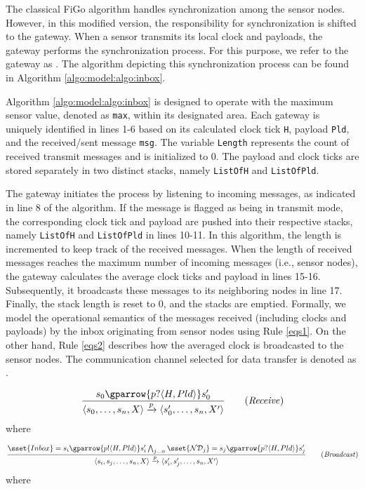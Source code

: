 The classical FiGo algorithm handles synchronization among the sensor nodes. However, in this modified version, the responsibility for synchronization is shifted to the gateway. When a sensor transmits its local clock and payloads, the gateway performs the synchronization process. For this purpose, we refer to the gateway as . The algorithm depicting this synchronization process can be found in Algorithm \ref{algo:model:algo:inbox}.

Algorithm \ref{algo:model:algo:inbox} is designed to operate with the maximum sensor value, denoted as \texttt{max}, within its designated area. Each gateway is uniquely identified in lines 1-6 based on its calculated clock tick \texttt{H}, payload \texttt{Pld}, and the received/sent message \texttt{msg}. The variable \texttt{Length} represents the count of received transmit messages and is initialized to 0. The payload and clock ticks are stored separately in two distinct stacks, namely \texttt{ListOfH} and \texttt{ListOfPld}.

The  gateway initiates the process by listening to incoming messages, as indicated in line 8 of the algorithm. If the message is flagged as being in transmit mode, the corresponding clock tick and payload are pushed into their respective stacks, namely \texttt{ListOfH} and \texttt{ListOfPld} in lines 10-11. In this algorithm, the length is incremented to keep track of the received messages. When the length of received messages reaches the maximum number of incoming messages (i.e., sensor nodes), the gateway calculates the average clock ticks and payload in lines 15-16. Subsequently, it broadcasts these messages to its neighboring nodes in line 17. Finally, the stack length is reset to 0, and the stacks are emptied. Formally, we model the operational semantics of the messages received (including clocks and payloads) by the inbox originating from sensor nodes using Rule \ref{eqs1}. On the other hand, Rule \ref{eqs2} describes how the averaged clock is broadcasted to the sensor nodes. The communication channel selected for data transfer is denoted as .


\begin{boxD}

   \begin{equation}\frac{ s_{0} \gparrow{p?\langle H, Pld\rangle} s'_{0}} { \langle s_{0},\ldots,s_{n},X\rangle \xrightarrow{p}\langle s'_{0},\ldots,s_{n},X'\rangle  } \label{eqs1} \tag{\emph{Receive}} 
   \end{equation}
      where   

         \begin{equation}\frac{ \sset{Inbox} =s_{i} \gparrow{p!\langle H, Pld\rangle} s'_{i} \bigwedge_{j \ldots n} \sset{\mathcal{ND}_{j}} =s_{j} \gparrow{p?\langle H, Pld\rangle} s'_{j}} { \langle s_{i}, s_{j},\ldots,s_{n},X\rangle \xrightarrow{p}\langle s'_{i},s'_{j},\ldots,s_{n},X'\rangle  } \label{eqs2} \tag{\emph{Broadcast}} 
   \end{equation}
      where   
	     
\end{boxD}

